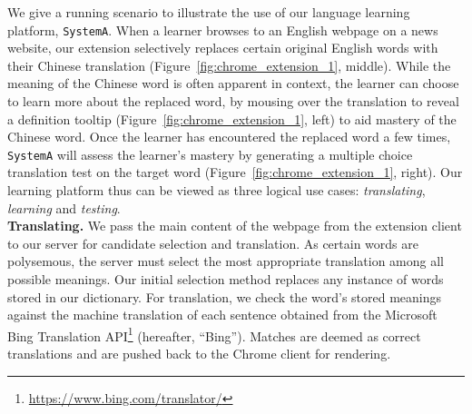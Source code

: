 \begin{CJK}{UTF8}{gbsn}
We give a running scenario to illustrate the use of our language
learning platform, {\tt SystemA}.  When a learner browses to an
English webpage on a news website, our extension selectively replaces
certain original English words with their Chinese translation
(Figure~\ref{fig:chrome_extension_1}, middle).  While the meaning of
the Chinese word is often apparent in context, the learner can choose
to learn more about the replaced word, by mousing over the translation
to reveal a definition tooltip (Figure~\ref{fig:chrome_extension_1},
left) to aid mastery of the Chinese word.  Once the learner has
encountered the replaced word a few times, {\tt SystemA} will assess
the learner's mastery by generating a multiple choice translation test
on the target word (Figure~\ref{fig:chrome_extension_1}, right). Our
learning platform thus can be viewed as three logical use cases:
{\it translating}, {\it learning} and {\it testing}. \\

{\bf Translating.}  We pass the main content of the webpage from the
extension client to our server for candidate selection and
translation.  As certain words are polysemous, the server must select
the most appropriate translation among all possible meanings. Our
initial selection method replaces any instance of words stored in our
dictionary. For translation, we check the word's stored meanings
against the machine translation of each sentence obtained from the
Microsoft Bing Translation API\footnote{\url{https://www.bing.com/translator/}} 
(hereafter, ``Bing'').  Matches are
deemed as correct translations and are pushed back to the Chrome
client for rendering.



\end{CJK}
